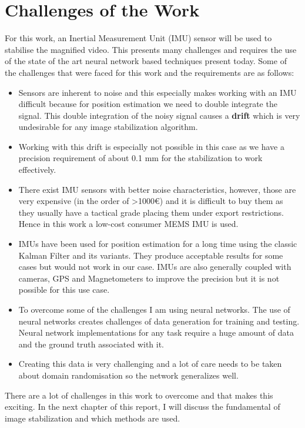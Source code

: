 \section{Challenges of the Work}
For this work, an Inertial Measurement Unit (IMU) sensor will be used to stabilise the magnified video. This presents many challenges and requires the use of the state of the art neural network based techniques present today. Some of the challenges that were faced for this work and the requirements are as follows:

\begin{itemize}
\item Sensors are inherent to noise and this especially makes working with an IMU difficult because for position estimation we need to double integrate the signal. This double integration of the noisy signal causes a \textbf{drift} which is very undesirable for any image stabilization algorithm. 
\item Working with this drift is especially not possible in this case as we have a precision requirement of about 0.1 mm for the stabilization to work effectively.
\item There exist IMU sensors with better noise characteristics, however, those are very expensive (in the order of >1000€) and it is difficult to buy them as they usually have a tactical grade placing them under export restrictions. Hence in this work a low-cost consumer MEMS IMU is used.
\item IMUs have been used for position estimation for a long time using the classic Kalman Filter and its variants. They produce acceptable results for some cases but would not work in our case. IMUs are also generally coupled with cameras, GPS and Magnetometers to improve the precision but it is not possible for this use case.
\item  To overcome some of the challenges I am using neural networks. The use of neural networks creates challenges of data generation for training and testing. Neural network implementations for any task require a huge amount of data and the ground truth associated with it.
\item Creating this data is very challenging and a lot of care needs to be taken about domain randomisation so the network generalizes well.
\end{itemize}

There are a lot of challenges in this work to overcome and that makes this exciting. In the next chapter of this report, I will discuss the fundamental of image stabilization and which methods are used.
